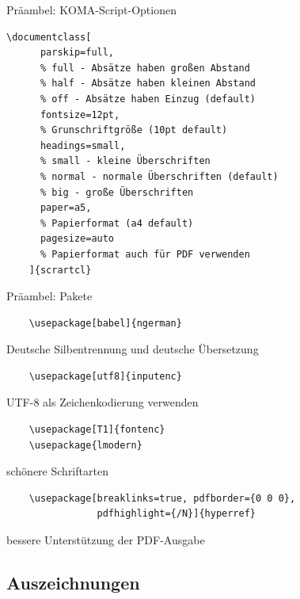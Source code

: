 \begin{Frame}[fragile]{Präambel: KOMA-Script-Optionen}
  \begin{lstlisting}[gobble=4]
    \documentclass[
      parskip=full,
      % full - Absätze haben großen Abstand
      % half - Absätze haben kleinen Abstand
      % off - Absätze haben Einzug (default)
      fontsize=12pt,
      % Grunschriftgröße (10pt default)
      headings=small,
      % small - kleine Überschriften
      % normal - normale Überschriften (default)
      % big - große Überschriften
      paper=a5,
      % Papierformat (a4 default)
      pagesize=auto
      % Papierformat auch für PDF verwenden
    ]{scrartcl}
  \end{lstlisting}
\end{Frame}

\begin{Frame}[fragile]{Präambel: Pakete}
  \begin{lstlisting}
    \usepackage[babel]{ngerman}
  \end{lstlisting}
  Deutsche Silbentrennung und deutsche Übersetzung
  \begin{lstlisting}
    \usepackage[utf8]{inputenc}
  \end{lstlisting}
  UTF-8 als Zeichenkodierung verwenden
  \begin{lstlisting}
    \usepackage[T1]{fontenc}
    \usepackage{lmodern}
  \end{lstlisting}
  schönere Schriftarten
  \begin{lstlisting}
    \usepackage[breaklinks=true, pdfborder={0 0 0},
                pdfhighlight={/N}]{hyperref}
  \end{lstlisting}
  bessere Unterstützung der PDF-Ausgabe
\end{Frame}

\subsection{Auszeichnungen}

